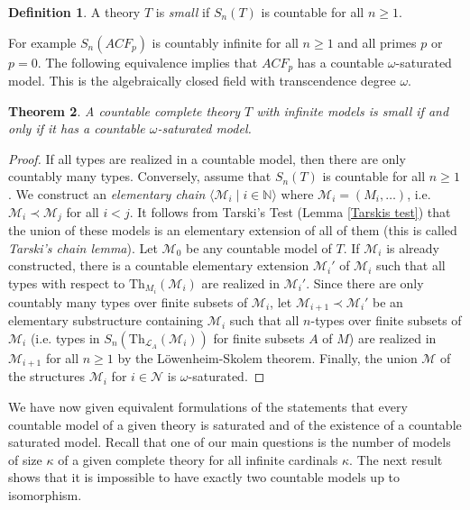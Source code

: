 \documentclass[10pt]{amsart}
\renewcommand{\L}{\mathcal{L}}
\newcommand{\NNN}{\mathbb{N}}
\newcommand{\MM}{\mathcal{M}}
\newcommand{\NN}{\mathcal{N}}
\newcommand{\Th}{\mathrm{Th}}
\newtheorem{theorem}{Theorem}[subsection]
\theoremstyle{definition}
\newtheorem{definition}[theorem]{Definition}
\theoremstyle{remark}
\begin{document}
\begin{definition} 
A theory $T$ is \emph{small} if $S_n(T)$ is countable for all $n\geq 1$. 
\end{definition} 

For example $S_n(ACF_p)$ is countably infinite for all $n\geq 1$ and all primes $p$ or $p=0$. The following equivalence implies that $ACF_p$ has a countable $\omega$-saturated model. This is the algebraically closed field with transcendence degree $\omega$. 

\begin{theorem} \label{characterization of small theories}
A countable complete theory $T$ with infinite models is small if and only if it has a countable $\omega$-saturated model. 
\end{theorem} 
\begin{proof} 
If all types are realized in a countable model, then there are only countably many types. 
Conversely, assume that $S_n(T)$ is countable for all $n\geq 1$. We construct an \emph{elementary chain} $\langle \MM_i\mid i\in\NNN\rangle$ where $\MM_i=(M_i,\dots)$, i.e. $\MM_i\prec\MM_j$ for all $i<j$. It follows from Tarski's Test (Lemma \ref{Tarskis test}) that the union of these models is an elementary extension of all of them (this is called \emph{Tarski's chain lemma}). 
Let $\MM_0$ be any countable model of $T$. If $\MM_i$ is already constructed, there is a countable elementary extension $\MM_i'$ of $\MM_i$ such that all types with respect to $\Th_{M_i}(\MM_i)$ are realized in $\MM_i'$. Since there are only countably many types over finite subsets of $\MM_i$, let $\MM_{i+1}\prec \MM_i'$ be an elementary substructure containing $\MM_i$ such that all $n$-types over finite subsets of $\MM_i$ (i.e. types in $S_n(\Th_{\L_A}(\MM_i))$ for finite subsets $A$ of $M$) are realized in $\MM_{i+1}$ for all $n\geq1$ by the L\"owenheim-Skolem theorem. 
Finally, the union $\MM$ of the structures $\MM_i$ for $i\in\NN$ is $\omega$-saturated. 
\end{proof} 

We have now given equivalent formulations of the statements that every countable model of a given theory is saturated and of the existence of a countable saturated model. Recall that one of our main questions is the number of models of size $\kappa$ of a given complete theory for all infinite cardinals $\kappa$. The next result shows that it is impossible to have exactly two countable models up to isomorphism. 
\end{document}
